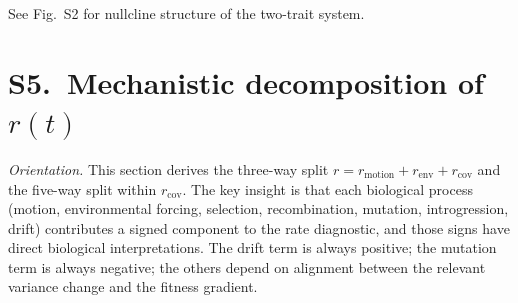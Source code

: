 \documentclass[11pt]{article}
\begin{document}
See Fig.~S2 for nullcline structure of the two-trait system.

\section*{S5.~Mechanistic decomposition of $r(t)$}
\label{sec:decomp_r}

\noindent\textit{Orientation.}
This section derives the three-way split
$r = r_{\mathrm{motion}} + r_{\mathrm{env}} + r_{\mathrm{cov}}$
and the five-way split within $r_{\mathrm{cov}}$.
The key insight is that each biological process (motion, environmental
forcing, selection, recombination, mutation, introgression, drift)
contributes a signed component to the rate diagnostic, and those
signs have direct biological interpretations.
The drift term is always positive; the mutation term is always
negative; the others depend on alignment between the relevant
variance change and the fitness gradient.
\end{document}
